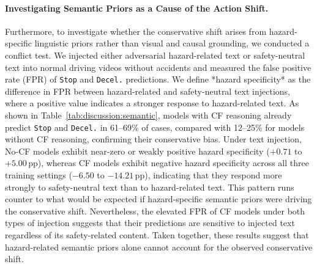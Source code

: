 \documentclass{article}
\begin{document}
\paragraph{Investigating Semantic Priors as a Cause of the Action Shift.} Furthermore, to investigate whether the conservative shift arises from hazard-specific linguistic priors rather than visual and causal grounding, we conducted a conflict test. We injected either adversarial hazard-related text or safety-neutral text into normal driving videos without accidents and measured the false positive rate (FPR) of \texttt{Stop} and \texttt{Decel.} predictions. We define *hazard specificity* as the difference in FPR between hazard-related and safety-neutral text injections, where a positive value indicates a stronger response to hazard-related text. As shown in Table~\ref{tab:discussion:semantic}, models with CF reasoning already predict \texttt{Stop} and \texttt{Decel.} in 61--69\% of cases, compared with 12--25\% for models without CF reasoning, confirming their conservative bias. Under text injection, No-CF models exhibit near-zero or weakly positive hazard specificity ($+0.71$ to $+5.00$\,pp), whereas CF models exhibit negative hazard specificity across all three training settings ($-6.50$ to $-14.21$\,pp), indicating that they respond more strongly to safety-neutral text than to hazard-related text. This pattern runs counter to what would be expected if hazard-specific semantic priors were driving the conservative shift. Nevertheless, the elevated FPR of CF models under both types of injection suggests that their predictions are sensitive to injected text regardless of its safety-related content. Taken together, these results suggest that hazard-related semantic priors alone cannot account for the observed conservative shift.
\end{document}
